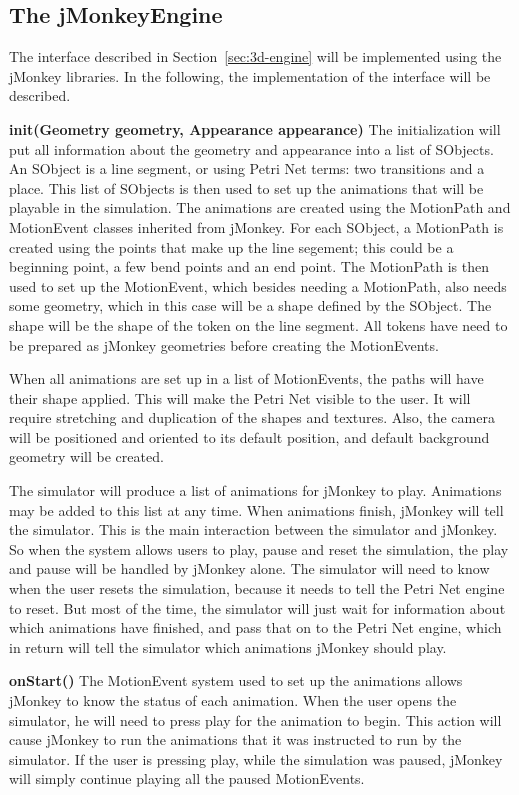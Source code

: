 \subsection{The jMonkeyEngine}
The interface described in Section~\ref{sec:3d-engine} will be implemented using the jMonkey libraries. In the following, the implementation of the interface will be described.

\textbf{init(Geometry geometry, Appearance appearance)}
The initialization will put all information about the geometry and appearance into a list of SObjects. An SObject is a line segment, or using Petri Net terms: two transitions and a place. This list of SObjects is then used to set up the animations that will be playable in the simulation. The animations are created using the MotionPath and MotionEvent classes inherited from jMonkey. For each SObject, a MotionPath is created using the points that make up the line segement; this could be a beginning point, a few bend points and an end point. The MotionPath is then used to set up the MotionEvent, which besides needing a MotionPath, also needs some geometry, which in this case will be a shape defined by the SObject. The shape will be the shape of the token on the line segment. All tokens have need to be prepared as jMonkey geometries before creating the MotionEvents.

When all animations are set up in a list of MotionEvents, the paths will have their shape applied. This will make the Petri Net visible to the user. It will require stretching and duplication of the shapes and textures. Also, the camera will be positioned and oriented to its default position, and default background geometry will be created.

The simulator will produce a list of animations for jMonkey to play. Animations may be added to this list at any time. When animations finish, jMonkey will tell the simulator. This is the main interaction between the simulator and jMonkey. So when the system allows users to play, pause and reset the simulation, the play and pause will be handled by jMonkey alone. The simulator will need to know when the user resets the simulation, because it needs to tell the Petri Net engine to reset. But most of the time, the simulator will just wait for information about which animations have finished, and pass that on to the Petri Net engine, which in return will tell the simulator which animations jMonkey should play.

\textbf{onStart()}
The MotionEvent system used to set up the animations allows jMonkey to know the status of each animation. When the user opens the simulator, he will need to press play for the animation to begin. This action will cause jMonkey to run the animations that it was instructed to run by the simulator. If the user is pressing play, while the simulation was paused, jMonkey will simply continue playing all the paused MotionEvents.

